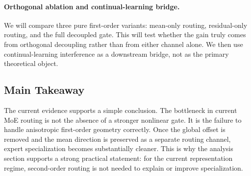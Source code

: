 \paragraph{Orthogonal ablation and continual-learning bridge.}
We will compare three pure first-order variants: mean-only routing, residual-only routing, and the full decoupled gate. This will test whether the gain truly comes from orthogonal decoupling rather than from either channel alone. We then use continual-learning interference as a downstream bridge, not as the primary theoretical object.

\subsection{Main Takeaway}
The current evidence supports a simple conclusion. The bottleneck in current MoE routing is not the absence of a stronger nonlinear gate. It is the failure to handle anisotropic first-order geometry correctly. Once the global offset is removed and the mean direction is preserved as a separate routing channel, expert specialization becomes substantially cleaner. This is why the analysis section supports a strong practical statement: for the current representation regime, second-order routing is not needed to explain or improve specialization.
